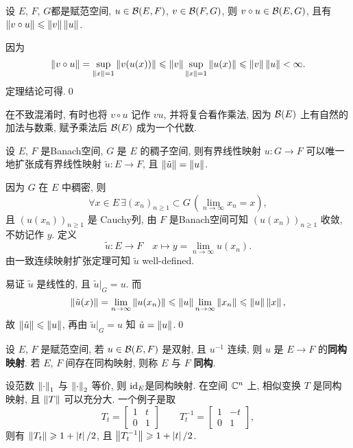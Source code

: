 	\begin{Theorem}
		 设 $ E $, $ F $, $ G $都是赋范空间,  $ u\in\mathcal{B}(E, F) $, $ v\in\mathcal{B}(F, G) $, 则 $ v\circ u\in\mathcal{B}(E, G) $, 且有 $ \left\| v\circ u \right\|\leqslant\left\| v \right\|\left\| u \right\| $.
	\end{Theorem}
	\begin{Proof}
		因为
		\[
			\left\| v\circ u \right\|=\sup_{\left\| x \right\|=1}\left\| v(u(x)) \right\|\leqslant\left\| v \right\|\sup_{\left\| x \right\|=1}\left\| u(x) \right\|\leqslant\left\| v \right\|\left\| u \right\|<\infty.
		\]
		定理结论可得.\qed
	\end{Proof}

	\begin{Remark}
		在不致混淆时, 有时也将 $ v\circ u $ 记作 $ vu $, 并将复合看作乘法, 因为 $ \mathcal{B}(E) $ 上有自然的加法与数乘, 赋予乘法后 $ \mathcal{B}(E) $ 成为一个代数.
	\end{Remark}

	\begin{Theorem}
		设 $ E $, $ F $ 是Banach空间,  $ G $ 是 $ E $ 的稠子空间, 则有界线性映射 $ u: G\to F $ 可以唯一地扩张成有界线性映射 $ \tilde{u}:E\to F $, 且 $ \left\| \tilde{u} \right\|=\left\| u \right\| $.
   \end{Theorem}
   \begin{Proof}
		因为 $ G $ 在 $ E $ 中稠密, 则
		\[
			\forall x\in E\,\exists(x_{n})_{n\geqslant1}\subset G\,(\lim_{n\to\infty}x_{n}=x),
		\]
		且 $ (u(x_{n}))_{n\geqslant1} $ 是 Cauchy列, 由 $ F $ 是Banach空间可知 $ (u(x_{n}))_{n\geqslant1} $ 收敛, 不妨记作 $ y $. 定义
		\[
			\tilde{u}: E\to F\quad x\mapsto y=\lim_{n\to\infty}u(x_{n}).
		\]
		由一致连续映射扩张定理可知 $ \tilde{u} $ well-defined.

		易证 $ \tilde{u} $ 是线性的, 且 $ \tilde{u}|_{G}=u $. 而
		\[
			\left\| \tilde{u}(x) \right\|=\lim_{n\to\infty}\left\| u(x_{n}) \right\|\leqslant\left\| u \right\|\lim_{n\to\infty}\left\| x_{n} \right\|\leqslant\left\| u \right\|\left\| x \right\|,
		\]
		故 $ \left\| \tilde{u} \right\|\leqslant\left\| u \right\| $, 再由 $ \tilde{u}|_{G}=u $ 知 $ \tilde{u}=\left\| u \right\| $.\qed
		
	\end{Proof}

	\begin{Definition}[同构]\label{def:同构}
		 设 $ E $, $ F $ 是赋范空间, 若 $ u\in\mathcal{B}(E, F) $ 是双射, 且 $ u^{-1} $ 连续, 则 $ u $ 是 $ E\to F $ 的\textbf{同构映射}. 若 $ E $, $ F $ 间存在同构映射, 则称 $ E $ 与 $ F $ \textbf{同构}.
	\end{Definition}

	\begin{Remark}
		设范数 $ \left\| \cdot \right\|_{1} $ 与 $ \left\| \cdot \right\|_{2} $ 等价, 则 $ \mathrm{id}_{E} $是同构映射. 在空间 $ \mathbb{C}^{n} $ 上, 相似变换 $ T $ 是同构映射, 且 $ \left\| T \right\| $ 可以充分大. 一个例子是取
		\[
			T_{t}=\begin{bmatrix}
				1 & t\\
				0 & 1
			\end{bmatrix}
			\qquad
			T_{t}^{-1}=\begin{bmatrix}
				1 & -t \\
				0 & 1
			\end{bmatrix},
		\]
		则有 $ \left\| T_{t} \right\|\geqslant1+\left| t \right| /2 $, 且 $ \left\| T_{t}^{-1} \right\|\geqslant 1+\left| t \right| /2 $.  
	\end{Remark}

